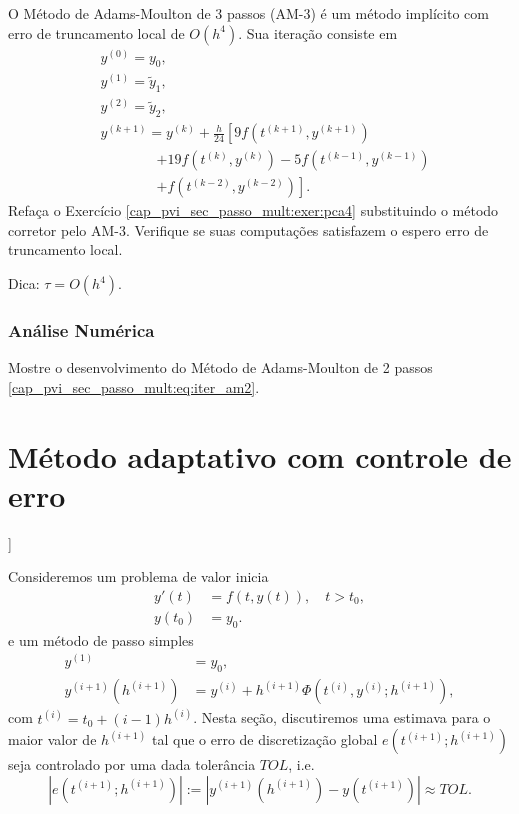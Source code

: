 \begin{exer}
  O Método de Adams-Moulton de 3 passos (AM-3) é um método implícito com erro de truncamento local de $O(h^4)$. Sua iteração consiste em
  \begin{equation}
    \begin{aligned}
      &y^{(0)} = y_0,\\
      &y^{(1)} = \tilde{y}_1,\\
      &y^{(2)} = \tilde{y}_2,\\
      &y^{(k+1)} = y^{(k)} + \frac{h}{24}\left[9f\left(t^{(k+1)},y^{(k+1)}\right) \right.\\
    &\qquad\qquad\left. + 19f\left(t^{(k)},y^{(k)}\right) - 5f\left(t^{(k-1)},y^{(k-1)}\right) \right. \\
    &\qquad\qquad\left. + f\left(t^{(k-2)},y^{(k-2)}\right)\right].      
  \end{aligned}
  \end{equation}
  Refaça o Exercício \ref{cap_pvi_sec_passo_mult:exer:pca4} substituindo o método corretor pelo AM-3. Verifique se suas computações satisfazem o espero erro de truncamento local.
\end{exer}
\begin{resp}
  Dica: $\tau = O(h^4)$.
\end{resp}

\subsubsection{Análise Numérica}

\begin{exer}\label{cap_pvi_sec_passo_mult:exer:am2}
  Mostre o desenvolvimento do Método de Adams-Moulton de 2 passos \eqref{cap_pvi_sec_passo_mult:eq:iter_am2}.
\end{exer}

\section{Método adaptativo com controle de erro}\label{cap_pvi_met_adap}

\begin{flushleft}
  [[tag:revisar]]
\end{flushleft}

Consideremos um problema de valor inicia
\begin{align}
  y'(t) &= f(t,y(t)),\quad t>t_0,\\
  y(t_0) &= y_0.
\end{align}
e um método de passo simples
\begin{align}
  y^{(1)} &= y_0,\\
  y^{(i+1)}(h^{(i+1)}) &= y^{(i)} + h^{(i+1)}\Phi(t^{(i)},y^{(i)};h^{(i+1)}),
\end{align}
com $t^{(i)} = t_0 + (i-1)h^{(i)}$. Nesta seção, discutiremos uma estimava para o maior valor de $h^{(i+1)}$ tal que o erro de discretização global $e(t^{(i+1)};h^{(i+1)})$ seja controlado por uma dada tolerância $TOL$, i.e.
\begin{equation}\label{eq:pvi_erro_aux1}
  |e(t^{(i+1)};h^{(i+1)})| := |y^{(i+1)}(h^{(i+1)}) - y(t^{(i+1)})| \approx TOL.
\end{equation}

